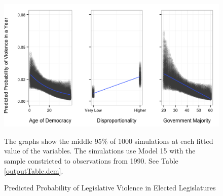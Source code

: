 \documentclass[a4paper]{article}\usepackage{graphicx, color}
\newenvironment{knitrout}{}{} %
\begin{document}
\begin{figure}[t]
    \caption{Predicted Probability of Legislative Violence in Elected Legislatures}  
    \label{pred_prob}
    \begin{center}


\begin{knitrout}
\color{fgcolor}
\includegraphics[width=0.8\linewidth]{figure/predProb} 

\end{knitrout}

    \end{center}
    \begin{singlespace}
      {\scriptsize{The graphs show the middle 95\% of 1000 simulations at each fitted value of the variables. The simulations use Model 15 with the sample constricted to observations from 1990. See Table \ref{outputTable.dem}.}}
    \end{singlespace}
\end{figure}
\end{document}
